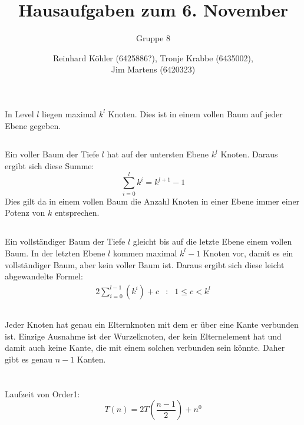 \documentclass[10pt,a4paper,oneside,ngerman,numbers=noenddot]{scrartcl}
\begin{document}
\author{Reinhard Köhler (6425886?), Tronje Krabbe (6435002), \\
Jim Martens (6420323)}
\title{Hausaufgaben zum 6. November}
\subtitle{Gruppe 8}
\maketitle
\section{} %
	\subsection{} %
		In Level $l$ liegen maximal $k^{l}$ Knoten. Dies ist in einem vollen Baum auf jeder Ebene gegeben.
	\subsection{} %
		Ein voller Baum der Tiefe $l$ hat auf der untersten Ebene $k^{l}$ Knoten. Daraus ergibt sich diese Summe:
		\[
			\sum\limits_{i=0}^{l} k^{i} = k^{l+1} - 1
		\]
		Dies gilt da in einem vollen Baum die Anzahl Knoten in einer Ebene immer einer Potenz von $k$ entsprechen.
	\subsection{} %
		Ein vollständiger Baum der Tiefe $l$ gleicht bis auf die letzte Ebene einem vollen Baum. In der letzten Ebene $l$ kommen maximal $k^{l} - 1$ Knoten vor, damit es ein vollständiger Baum, aber kein voller Baum ist. Daraus ergibt sich diese leicht abgewandelte Formel:
		\begin{alignat*}{2}
			\sum\limits_{i=0}^{l-1} \left(k^{i}\right) + c &:& 1 \leq c < k^{l}
		\end{alignat*}
	\subsection{} %
		Jeder Knoten hat genau ein Elternknoten mit dem er über eine Kante verbunden ist. Einzige Ausnahme ist der Wurzelknoten, der kein Elternelement hat und damit auch keine Kante, die mit einem solchen verbunden sein könnte. Daher gibt es genau $n-1$ Kanten.
\section{} %
	\subsection{} %
		Laufzeit von Order1:
		\[
			T(n) = 2T\left(\frac{n-1}{2}\right) + n^{0}
		\]
\end{document}
